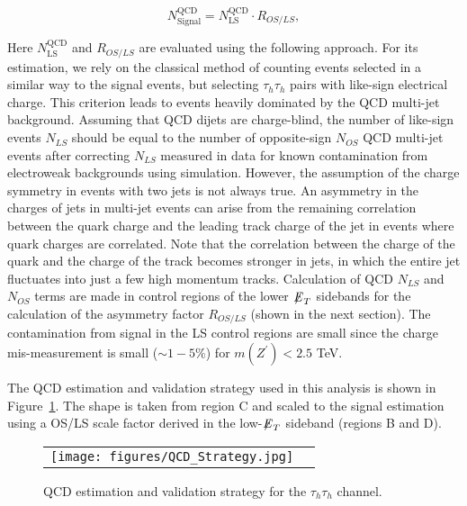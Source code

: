 \begin{equation}                                                                                                                                                      
N_{\textrm{Signal}}^{\textrm{QCD}} = N_{\textrm{LS}}^{\textrm{QCD}} \cdot R_{OS/LS},
\end{equation}
   
Here $N_{\textrm{LS}}^{\textrm{QCD}}$ and $R_{OS/LS}$ are evaluated using the following approach. For its estimation, we rely on the classical method of counting events selected in a similar way to the signal events, but selecting $\tau_{h}\tau_{h}$ pairs with like-sign electrical charge. This criterion leads to events heavily dominated by the QCD multi-jet background. Assuming that QCD dijets are charge-blind, the number of like-sign events $N_{LS}$ should be equal to the number of opposite-sign $N_{OS}$ QCD multi-jet events after correcting $N_{LS}$ measured in data for known contamination from electroweak backgrounds using simulation. However, the assumption of the charge symmetry in events with two jets is not always true. An asymmetry in the charges of jets in multi-jet events can arise from the remaining correlation
between the quark charge and the leading track charge of the jet in events where quark charges are correlated. 
Note that the correlation between the charge of the quark and the charge of the track
becomes stronger in jets, in which the entire jet fluctuates into just a few high momentum tracks. Calculation of QCD $N_{LS}$ and $N_{OS}$ terms are made in control regions of the lower ${\not\mathrel{E}}_T$ sidebands for the calculation of the asymmetry factor $R_{OS/LS}$ (shown in the next section). 
The contamination from signal in the LS control regions are small since the charge mis-measurement is small ($\sim 1-5\%$) for $m(Z^{\prime}) < 2.5$ TeV. 

The QCD estimation and validation strategy used in this analysis is shown in Figure~\ref{fig:qcd}. The shape is taken from region C and scaled to the signal estimation using a OS/LS scale factor derived in the low-${\not\mathrel{E}}_T$ sideband (regions B and D).    

 \begin{figure}[tbh!]
     \centering
     \begin{tabular}{cc}
       \texttt{[image: figures/QCD\_Strategy.jpg]}
     \end{tabular}
     \caption{QCD estimation and validation strategy for the $\tau_{h}\tau_{h}$ channel.}
    \label{fig:qcd}
   \end{figure}


